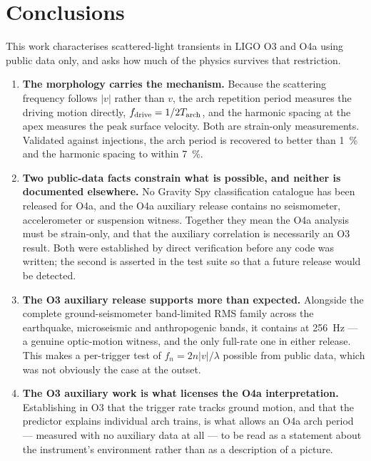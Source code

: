 \section{Conclusions}
\label{sec:conclusions}

This work characterises scattered-light transients in LIGO O3 and O4a using
public data only, and asks how much of the physics survives that restriction.

\begin{enumerate}

\item \textbf{The morphology carries the mechanism.} Because the scattering
frequency follows $|v|$ rather than $v$, the arch repetition period measures
the driving motion directly, $f_{\mathrm{drive}} = 1/2T_{\mathrm{arch}}$, and the harmonic spacing
at the apex measures the peak surface velocity. Both are strain-only
measurements. Validated against injections, the arch period is recovered to
better than \SI{1}{\percent} and the harmonic spacing to within
\SI{7}{\percent}.

\item \textbf{Two public-data facts constrain what is possible, and neither is
documented elsewhere.} No Gravity Spy classification catalogue has been
released for O4a, and the O4a auxiliary release contains no seismometer,
accelerometer or suspension witness. Together they mean the O4a analysis must
be strain-only, and that the auxiliary correlation is necessarily an O3
result. Both were established by direct verification before any code was
written; the second is asserted in the test suite so that a future release
would be detected.

\item \textbf{The O3 auxiliary release supports more than expected.} Alongside
the complete ground-seismometer band-limited RMS family across the earthquake,
microseismic and anthropogenic bands, it contains
 at \SI{256}{\hertz} --- a genuine
optic-motion witness, and the only full-rate one in either release. This makes
a per-trigger test of $f_n = 2n|v|/\lambda$ possible from public data, which
was not obviously the case at the outset.

\item \textbf{The O3 auxiliary work is what licenses the O4a interpretation.}
Establishing in O3 that the trigger rate tracks ground motion, and that the
predictor explains individual arch trains, is what allows an O4a arch period
--- measured with no auxiliary data at all --- to be read as a statement about
the instrument's environment rather than as a description of a picture.


\end{enumerate}
